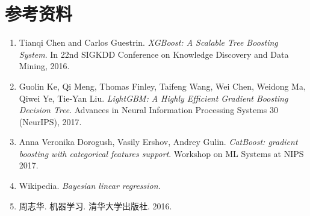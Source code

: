\documentclass[logo,reportComp]{thesis}
\begin{document}
\section{参考资料}
\begin{enumerate}
	\item Tianqi Chen and Carlos Guestrin. \emph{XGBoost: A Scalable Tree Boosting System}. In 22nd SIGKDD Conference on Knowledge Discovery and Data Mining, 2016.
	\item Guolin Ke, Qi Meng, Thomas Finley, Taifeng Wang, Wei Chen, Weidong Ma, Qiwei Ye, Tie-Yan Liu. \emph{LightGBM: A Highly Efficient Gradient Boosting Decision Tree}. Advances in Neural Information Processing Systems 30 (NeurIPS), 2017.
	\item Anna Veronika Dorogush, Vasily Ershov, Andrey Gulin. \emph{CatBoost: gradient boosting with categorical features support}. Workshop on ML Systems at NIPS 2017.
	\item Wikipedia. \emph{Bayesian linear regression}.
	\item 周志华. 机器学习. 清华大学出版社. 2016.
\end{enumerate}
\end{document}
